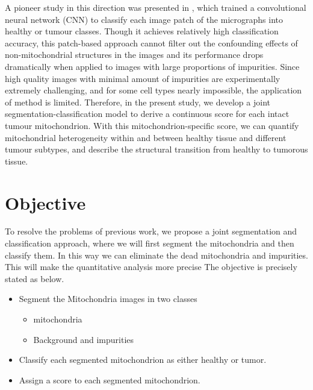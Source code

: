 A pioneer study in this direction was presented in \cite{DBLP:conf/isbi/MishraSWSMNZP16}, which trained a convolutional neural network (CNN) to classify each image patch of the micrographs
into healthy or tumour classes. 
Though it achieves relatively high classification accuracy, this patch-based approach cannot filter out the confounding effects
of non-mitochondrial structures in the images and its performance drops dramatically when applied to images with large proportions of impurities. Since high quality images with minimal amount of impurities are experimentally extremely challenging, and for some cell types nearly impossible, the application of \cite{DBLP:conf/isbi/MishraSWSMNZP16} method is limited. Therefore, in the present study, we develop a joint
segmentation-classification model to derive a continuous score for each intact
tumour mitochondrion. With this mitochondrion-specific score, we can quantify
mitochondrial heterogeneity within and between healthy tissue and different tumour subtypes, and describe the structural transition from healthy to tumorous
tissue.
		\section{Objective}
		To resolve the problems of previous work, we propose a joint segmentation and classification approach, where we will first segment the mitochondria and then classify them. In this way we can eliminate the dead mitochondria and impurities.  This will make the quantitative analysis more precise
		The objective is precisely stated as below. 
	\begin{itemize}
	\item 	Segment the Mitochondria images in two classes 
	\begin{itemize}
		\item mitochondria 
		\item Background and impurities
	\end{itemize} 
	
	 \item Classify each segmented mitochondrion as either healthy or tumor.
	 \item Assign a score to each segmented mitochondrion. 
	 
	 \end{itemize}
		